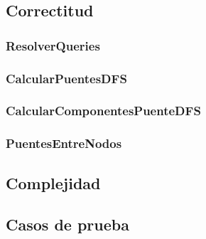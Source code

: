 \subsection{Correctitud}

\subsubsection*{ResolverQueries}

\subsubsection*{CalcularPuentesDFS}

\subsubsection*{CalcularComponentesPuenteDFS}

\subsubsection*{PuentesEntreNodos}

\subsection{Complejidad}

\subsection{Casos de prueba}
